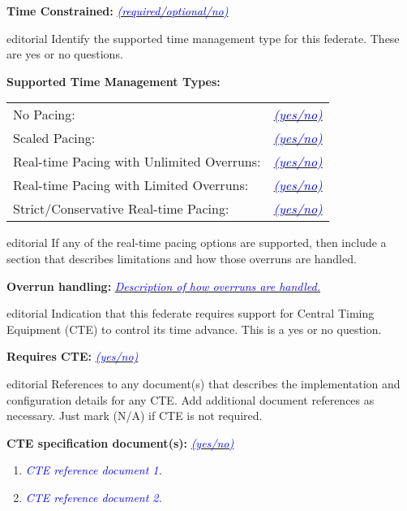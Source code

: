 \documentclass[11pt,english,letterpaper]{article}
\newcommand{\example}[1]{{\textcolor{blue}{\textit{#1}}}}
\begin{document}
\textbf{Time Constrained: } \underline{ \example{(required/optional/no)}}

\begin{shownto}{editorial}
{\color{red} Identify the supported time management type for this federate.
These are yes or no questions.}
\end{shownto}

\textbf{Supported Time Management Types: }

\hspace{0.25in}
\begin{tabular}{ll}
No Pacing:                                & \underline{\example{(yes/no)}} \\
Scaled Pacing:                            & \underline{\example{(yes/no)}} \\
Real-time Pacing with Unlimited Overruns: & \underline{\example{(yes/no)}} \\
Real-time Pacing with Limited Overruns:   & \underline{\example{(yes/no)}} \\
Strict/Conservative Real-time Pacing:     & \underline{\example{(yes/no)}} \\
\end{tabular}

\begin{shownto}{editorial}
{\color{red} If any of the real-time pacing options are supported, then
include a section that describes limitations and how those overruns are
handled.}
\end{shownto}

\textbf{Overrun handling: } \underline{\example{Description of how overruns
are handled.}}

\begin{shownto}{editorial}
{\color{red} Indication that this federate requires support for Central
Timing Equipment (CTE) to control its time advance. This is a yes or no
question.}
\end{shownto}

\textbf{Requires CTE: } \underline{\example{(yes/no)}}

\begin{shownto}{editorial}
{\color{red} References to any document(s) that describes the implementation
and configuration details for any CTE. Add additional document references as
necessary. Just mark (N/A) if CTE is not required.}
\end{shownto}

\textbf{CTE specification document(s): } \underline{\example{(yes/no)}}
\begin{enumerate}
\item \example{CTE reference document 1.}
\item \example{CTE reference document 2.}
\end{enumerate}
\end{document}
